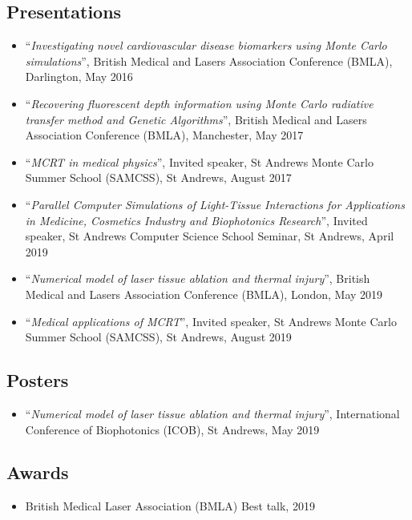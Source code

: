 \documentclass[10pt,a4paper,twoside]{book}
\begin{document}
\subsection*{Presentations}

\begin{itemize}
\item ``\textit{Investigating novel cardiovascular disease biomarkers using Monte Carlo simulations}'', British Medical and Lasers Association Conference (BMLA), Darlington, May 2016
\item ``\textit{Recovering fluorescent depth information using Monte Carlo radiative transfer method and Genetic Algorithms}'', British Medical and Lasers Association Conference (BMLA), Manchester, May 2017
\item ``\textit{MCRT in medical physics}'', Invited speaker, St Andrews Monte Carlo Summer School (SAMCSS), St Andrews, August 2017
\item ``\textit{Parallel Computer Simulations of Light-Tissue Interactions for Applications in Medicine, Cosmetics Industry and Biophotonics Research}'', Invited speaker, St Andrews Computer Science School Seminar, St Andrews, April 2019
\item ``\textit{Numerical model of laser tissue ablation and thermal injury}'', British Medical and Lasers Association Conference (BMLA), London, May 2019
\item ``\textit{Medical applications of MCRT}'', Invited speaker, St Andrews Monte Carlo Summer School (SAMCSS), St Andrews, August 2019
\end{itemize}


\subsection*{Posters}

\begin{itemize}
\item ``\textit{Numerical model of laser tissue ablation and thermal injury}'', International Conference of Biophotonics (ICOB), St Andrews, May 2019
\end{itemize}


\subsection*{Awards}

\begin{itemize}
\item British Medical Laser Association (BMLA) Best talk, 2019
\end{itemize}
\end{document}
